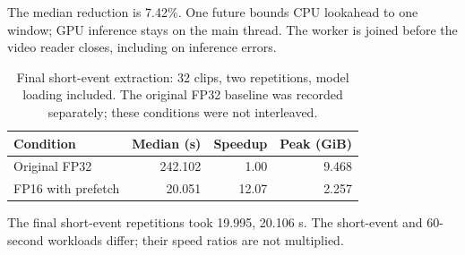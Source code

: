 The median reduction is 7.42\%. One future bounds CPU lookahead to one window; GPU inference stays on the main thread. The worker is joined before the video reader closes, including on inference errors.

\begin{table}[htbp]\centering\sffamily\small
\caption{Final short-event extraction: 32 clips, two repetitions, model loading included. The original FP32 baseline was recorded separately; these conditions were not interleaved.}\label{tab:prefetch-short}
\begin{tabular}{@{}lrrr@{}}\toprule
Condition & Median (s) & Speedup & Peak (GiB) \\\midrule
Original FP32 & 242.102 & 1.00 & 9.468 \\
FP16 with prefetch & 20.051 & 12.07 & 2.257 \\
\bottomrule\end{tabular}\end{table}

The final short-event repetitions took 19.995, 20.106 s. The short-event and 60-second workloads differ; their speed ratios are not multiplied.
